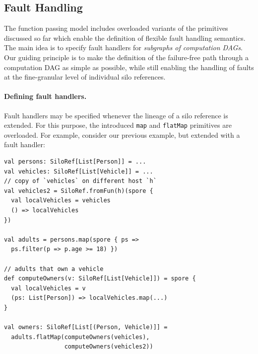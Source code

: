 \documentclass{jfp1}
\begin{document}

\subsection{Fault Handling}
\label{sec:fault-handling}

The function passing model includes overloaded variants of
the primitives discussed so far which enable the definition of flexible fault
handling semantics. The main idea is to specify fault handlers for {\em
subgraphs of computation DAGs}. Our guiding principle is to make the definition
of the failure-free path through a computation DAG as simple as possible, while
still enabling the handling of faults at the fine-granular level of individual
silo references.

\paragraph{Defining fault handlers.}

Fault handlers may be specified whenever the lineage of a silo reference is
extended. For this purpose, the introduced \verb|map| and \verb|flatMap|
primitives are overloaded. For example, consider our previous example, but
extended with a fault handler:

\begin{lstlisting}
val persons: SiloRef[List[Person]] = ...
val vehicles: SiloRef[List[Vehicle]] = ...
// copy of `vehicles` on different host `h`
val vehicles2 = SiloRef.fromFun(h)(spore {
  val localVehicles = vehicles
  () => localVehicles
})

val adults = persons.map(spore { ps =>
  ps.filter(p => p.age >= 18) })

// adults that own a vehicle
def computeOwners(v: SiloRef[List[Vehicle]]) = spore {
  val localVehicles = v
  (ps: List[Person]) => localVehicles.map(...)
}

val owners: SiloRef[List[(Person, Vehicle)]] =
  adults.flatMap(computeOwners(vehicles),
                 computeOwners(vehicles2))
\end{lstlisting}
\end{document}
